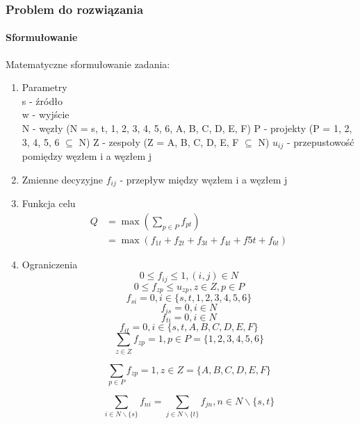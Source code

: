 \documentclass[12pt]{article}
\begin{document}
\subsubsection{Problem do rozwiązania}
\paragraph{Sformułowanie}
Matematyczne sformułowanie zadania:
\begin{enumerate}
\item Parametry \\
s - źródło \\
w - wyjście \\
N - węzły (N = {s, t, 1, 2, 3, 4, 5, 6, A, B, C, D, E, F})
P - projekty (P = {1, 2, 3, 4, 5, 6} $\subseteq$ N)
Z - zespoły (Z = {A, B, C, D, E, F} $\subseteq$ N)
$u_{ij}$ - przepustowość pomiędzy węzłem i a węzłem j
\item Zmienne decyzyjne
$f_{ij}$ - przepływ między węzłem i a węzłem j
\item Funkcja celu
\begin{align*}
    Q &= \max\left(\sum_{p \in P} f_{pt} \right) \\
    &= \max(f_{1t} + f_{2t} + f_{3t} + f_{4t} + f{5t} + f_{6t})
\end{align*}

\item Ograniczenia
\setcounter{equation}{0}
\begin{equation}
0 \leq f_{ij} \leq 1, (i, j) \in N
\end{equation}
\begin{equation}
0 \leq f_{zp} \leq u_{zp}, z \in Z, p \in P
\end{equation}
\begin{equation}
f_{si} = 0, i \in \{ s, t, 1, 2, 3, 4, 5, 6 \}
\end{equation}
\begin{equation}
f_{is} = 0, i \in N
\end{equation}
\begin{equation}
f_{ti} = 0, i \in N
\end{equation}
\begin{equation}
f_{it} = 0, i \in \{s, t, A, B, C, D, E, F\}
\end{equation}
\begin{equation}
\sum_{z \in Z} f_{zp} = 1, p \in P = \{ 1, 2, 3, 4, 5, 6 \}
\end{equation}

\begin{equation}
\sum_{p \in P} f_{zp} = 1, z \in Z = \{ A, B, C, D, E, F \}
\end{equation}

\begin{equation}
\sum_{i \in N \backslash \{s\}} f_{ni} = \sum_{j \in N \backslash \{t\}} f_{jn}, n \in N \backslash \{ s, t \}
\end{equation}



\end{enumerate}
\end{document}
